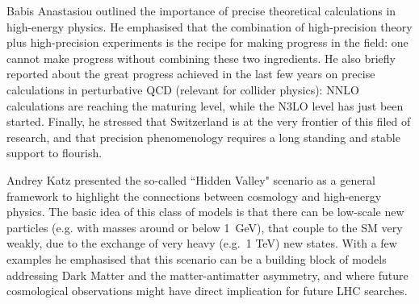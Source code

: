 \noindent Babis Anastasiou outlined the importance of precise theoretical calculations in high-energy 
physics. He emphasised that the combination of high-precision theory plus 
high-precision experiments is the recipe for making progress in the field: 
one cannot make progress without combining these two ingredients. He also briefly reported about the great progress
achieved in the last few years on precise calculations in 
perturbative QCD (relevant for collider physics): NNLO calculations are reaching 
the maturing level, while the N3LO level has just been started. 
Finally, he stressed that Switzerland is at the very frontier of this filed of research,
 and that precision phenomenology requires a long standing and stable support to flourish.
 \medskip
 
\noindent  Andrey Katz presented the so-called ``Hidden Valley"  scenario as a general
framework to highlight the connections between cosmology and high-energy physics.
 The basic idea of this class of models is that there can be low-scale new particles
  (e.g. with masses around or below 1~GeV), that couple to the SM very weakly, 
  due to the exchange of very heavy (e.g.~1 TeV) new states. With a few examples he 
  emphasised that this scenario can be a building block of models addressing 
Dark Matter and the matter-antimatter asymmetry, and where  
future cosmological observations might have direct implication for future LHC searches.
